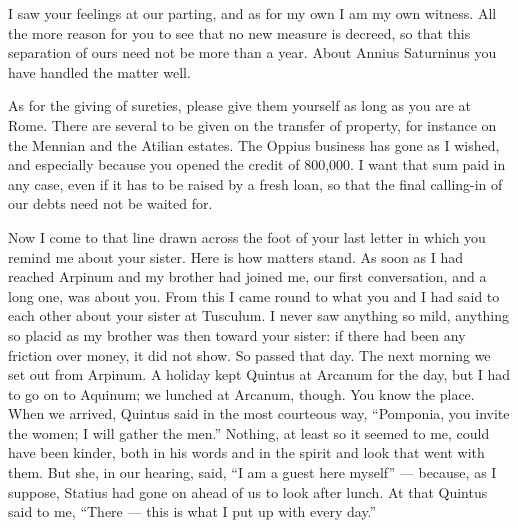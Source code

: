 

 I saw your feelings at our parting, and as for my own I am my own witness. All the more reason for you to see that no new measure is decreed, so that this separation of ours need not be more than a year. About Annius Saturninus you have handled the matter well.

 As for the giving of sureties, please give them yourself as long as you are at Rome. There are several to be given on the transfer of property, for instance on the Mennian and the Atilian estates. The Oppius business has gone as I wished, and especially because you opened the credit of 800{,}000. I want that sum paid in any case, even if it has to be raised by a fresh loan, so that the final calling-in of our debts need not be waited for.

 Now I come to that line drawn across the foot of your last letter in which you remind me about your sister. Here is how matters stand. As soon as I had reached Arpinum and my brother had joined me, our first conversation, and a long one, was about you. From this I came round to what you and I had said to each other about your sister at Tusculum. I never saw anything so mild, anything so placid as my brother was then toward your sister: if there had been any friction over money, it did not show. So passed that day. The next morning we set out from Arpinum. A holiday kept Quintus at Arcanum for the day, but I had to go on to Aquinum; we lunched at Arcanum, though. You know the place. When we arrived, Quintus said in the most courteous way, ``Pomponia, you invite the women; I will gather the men.'' Nothing, at least so it seemed to me, could have been kinder, both in his words and in the spirit and look that went with them. But she, in our hearing, said, ``I am a guest here myself'' --- because, as I suppose, Statius had gone on ahead of us to look after lunch. At that Quintus said to me, ``There --- this is what I put up with every day.''

